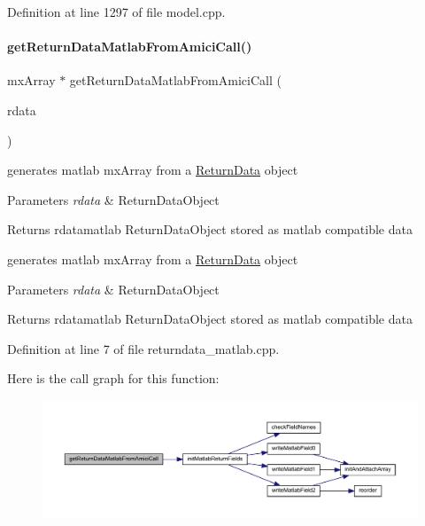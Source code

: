 Definition at line 1297 of file model.\+cpp.

\mbox{\label{namespaceamici_a698409f4b9ce06055bcebcee39f81a91}} 
\paragraph{\texorpdfstring{get\+Return\+Data\+Matlab\+From\+Amici\+Call()}{getReturnDataMatlabFromAmiciCall()}}
{\footnotesize\ttfamily mx\+Array $\ast$ get\+Return\+Data\+Matlab\+From\+Amici\+Call (\begin{DoxyParamCaption}\item[{\mbox{\hyperlink{classamici_1_1_return_data}{Return\+Data}} const $\ast$}]{rdata }\end{DoxyParamCaption})}

generates matlab mx\+Array from a \mbox{\hyperlink{classamici_1_1_return_data}{Return\+Data}} object 
\begin{DoxyParams}{Parameters}
{\em rdata} & Return\+Data\+Object \\
\hline
\end{DoxyParams}
\begin{DoxyReturn}{Returns}
rdatamatlab Return\+Data\+Object stored as matlab compatible data
\end{DoxyReturn}
generates matlab mx\+Array from a \mbox{\hyperlink{classamici_1_1_return_data}{Return\+Data}} object 
\begin{DoxyParams}{Parameters}
{\em rdata} & Return\+Data\+Object \\
\hline
\end{DoxyParams}
\begin{DoxyReturn}{Returns}
rdatamatlab Return\+Data\+Object stored as matlab compatible data
\end{DoxyReturn}


Definition at line 7 of file returndata\+\_\+matlab.\+cpp.

Here is the call graph for this function\+:
\nopagebreak
\begin{figure}[H]
\begin{center}
\leavevmode
\includegraphics[width=350pt]{namespaceamici_a698409f4b9ce06055bcebcee39f81a91_cgraph}
\end{center}
\end{figure}
\mbox{\label{namespaceamici_a7449834fca1e0bde53d5f73ae0d2b929}} 
